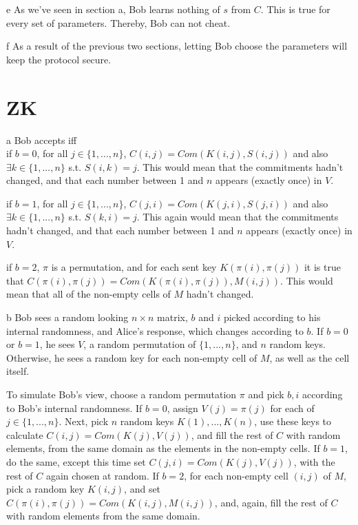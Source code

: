 \documentclass{article}
\begin{document}
\begin{paragraph}
    e As we've seen in section a, Bob learns nothing of $s$ from $C$. This is true for every set of parameters. Thereby, Bob
    can not cheat.
\end{paragraph}

\begin{paragraph}
    f As a result of the previous two sections, letting Bob choose the parameters will keep the protocol secure.
\end{paragraph}

\section{ZK}
\begin{paragraph}
    a Bob accepts iff\\
    
    \quad if \(b = 0\), for all \(j \in \{1, ..., n\}\), \(C(i, j) = Com(K(i, j), S(i, j))\) and also \(\exists k \in \{1, ..., n\}\) s.t. \(S(i, k) = j\). This would mean that the commitments hadn't changed, and that each number between 1 and \(n\) appears (exactly once) in \(V\).
    
    \quad if \(b = 1\), for all \(j \in \{1, ..., n\}\), \(C(j, i) = Com(K(j, i), S(j, i))\) and also \(\exists k \in \{1, ..., n\}\) s.t. \(S(k, i) = j\). This again would mean that the commitments hadn't changed, and that each number between 1 and \(n\) appears (exactly once) in \(V\).
    
    \quad if \(b = 2\), \(\pi\) is a permutation, and for each sent key \(K(\pi(i), \pi(j))\) it is true that \(C(\pi(i), \pi(j)) = Com(K(\pi(i), \pi(j)), M(i, j))\). This would mean that all of the non-empty cells of \(M\) hadn't changed.
\end{paragraph}

\begin{paragraph}
    b Bob sees a random looking \(n \times n\) matrix, \(b\) and \(i\) picked according to his internal randomness, and Alice's response, which changes according to \(b\). If \(b = 0\) or \(b = 1\), he sees \(V\), a random permutation of \(\{1, ..., n\}\), and \(n\) random keys. Otherwise, he sees a random key for each non-empty cell of \(M\), as well as the cell itself.
    
    To simulate Bob's view, choose a random permutation \(\pi\) and pick \(b, i\) according to Bob's internal randomness. If \(b = 0\), assign \(V(j) = \pi(j)\) for each of \(j \in \{1, ..., n\}\). Next, pick \(n\) random keys \(K(1), ..., K(n)\), use these keys to calculate \(C(i, j) = Com(K(j), V(j))\), and fill the rest of \(C\) with random elements, from the same domain as the elements in the non-empty cells. If \(b = 1\), do the same, except this time set \(C(j, i) = Com(K(j), V(j))\), with the rest of \(C\) again chosen at random. If \(b = 2\), for each non-empty cell \((i, j)\) of \(M\), pick a random key \(K(i, j)\), and set \(C(\pi(i), \pi(j)) = Com(K(i, j), M(i, j))\), and, again, fill the rest of \(C\) with random elements from the same domain.
\end{paragraph}
\end{document}
